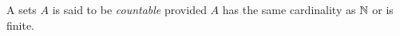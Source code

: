 \guard



\begin{defn}
\label{defn:countablyInfinite}
  A sets $A$ is said to be \emph{countable} provided $A$ has the same cardinality as $\mathbb{N}$ or is finite.
\end{defn}

